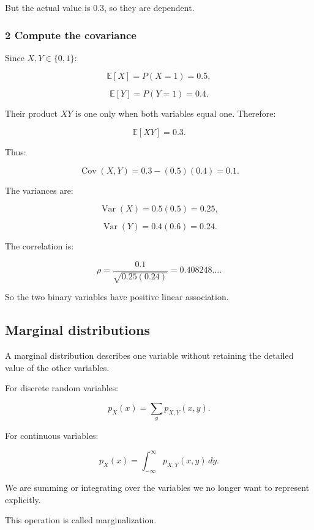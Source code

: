 But the actual value is \(0.3\), so they are dependent.

\subsubsection{2 Compute the covariance}\label{02-foundations-ii-ch023-compute-the-covariance}

\hypertarget{02-foundations-ii-ch023-compute-the-covariance}{}

Since \(X,Y\in\{0,1\}\):

\[
 \mathbb E[X]=P(X=1)=0.5,
\]

\[
 \mathbb E[Y]=P(Y=1)=0.4.
\]

Their product \(XY\) is one only when both variables equal one. Therefore:

\[
 \mathbb E[XY]=0.3.
\]

Thus:

\[
 \operatorname{Cov}(X,Y) = 0.3-(0.5)(0.4) =\boxed{0.1}.
\]

The variances are:

\[
 \operatorname{Var}(X)=0.5(0.5)=0.25,
\]

\[
 \operatorname{Var}(Y)=0.4(0.6)=0.24.
\]

The correlation is:

\[
 \rho= \frac{0.1}{\sqrt{0.25(0.24)}} =\boxed{0.408248\ldots}.
\]

So the two binary variables have positive linear association.

\subsection{Marginal distributions}\label{02-foundations-ii-ch023-marginal-distributions}

\hypertarget{02-foundations-ii-ch023-marginal-distributions}{}

A marginal distribution describes one variable without retaining the detailed value of the other variables.

For discrete random variables:

\[
 \boxed{ p_X(x)=\sum_yp_{X,Y}(x,y) }.
\]

For continuous variables:

\[
 \boxed{ p_X(x)= \int_{-\infty}^{\infty} p_{X,Y}(x,y)\,dy }.
\]

We are summing or integrating over the variables we no longer want to represent explicitly.

This operation is called marginalization.

